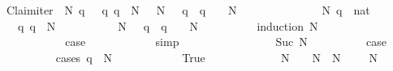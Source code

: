\begin{isabellebody}
\ Claim{}{\isacharunderscore}iter{\isacharprime}{\isacharcolon}\ {\isachardoublequoteopen}{\isasymAnd}\ N\ q{\isachardot}\ {\isasymlbrakk}{}\ {\isasymle}\ q{\isacharsemicolon}\ q\ {\isasymle}\ N{\isasymrbrakk}\ {\isasymLongrightarrow}\ {\isasymDelta}\ {\isacharparenleft}N{\isacharplus}{}{\isacharparenright}\ {\isasymle}\ {\isasymDelta}\ {\isacharparenleft}q{\isacharplus}{}{\isacharparenright}\ {\isacharasterisk}\ {\isacharparenleft}q\ {\isacharplus}\ {}{\isacharparenright}\ {\isacharslash}\ {\isacharparenleft}N\ {\isacharplus}\ {}{\isacharparenright}{\isachardoublequoteclose}\isanewline
\ \ \ \ \isamarkupfalse%
{\isacharminus}\isanewline
\ \ \ \ \ \ \isamarkupfalse%
\ N\ q\ {\isacharcolon}{\isacharcolon}\ nat\isanewline
\ \ \ \ \ \ \isamarkupfalse%
\ {\isachardoublequoteopen}{}\ {\isasymle}\ q{\isachardoublequoteclose}\ {\isachardoublequoteopen}q\ {\isasymle}\ N{\isachardoublequoteclose}\isanewline
\ \ \ \ \ \ \isamarkupfalse%
\ \isamarkupfalse%
\ {\isachardoublequoteopen}{\isasymDelta}\ {\isacharparenleft}N{\isacharplus}{}{\isacharparenright}\ {\isasymle}\ {\isasymDelta}\ {\isacharparenleft}q{\isacharplus}{}{\isacharparenright}\ {\isacharasterisk}\ {\isacharparenleft}q\ {\isacharplus}\ {}{\isacharparenright}\ {\isacharslash}\ {\isacharparenleft}N\ {\isacharplus}\ {}{\isacharparenright}{\isachardoublequoteclose}\isanewline
\ \ \ \ \ \ \isamarkupfalse%
\ {\isacharparenleft}induction\ N{\isacharparenright}\isanewline
\ \ \ \ \ \ \ \ \isamarkupfalse%
\ {}\isanewline
\ \ \ \ \ \ \ \ \isamarkupfalse%
\ \isamarkupfalse%
\ {\isacharquery}case\isanewline
\ \ \ \ \ \ \ \ \ \ \isamarkupfalse%
\ simp\isanewline
\ \ \ \ \ \ \isamarkupfalse%
\isanewline
\ \ \ \ \ \ \ \ \isamarkupfalse%
\ {\isacharparenleft}Suc\ N{\isacharparenright}\isanewline
\ \ \ \ \ \ \ \ \isamarkupfalse%
\ {\isacharquery}case\isanewline
\ \ \ \ \ \ \ \ \isamarkupfalse%
\ {\isacharparenleft}cases\ {\isachardoublequoteopen}q\ {\isasymle}\ N{\isachardoublequoteclose}{\isacharparenright}\isanewline
\ \ \ \ \ \ \ \ \ \ \isamarkupfalse%
\ True\isanewline
\ \ \ \ \ \ \ \ \ \ \isamarkupfalse%
\ {\isachardoublequoteopen}{\isasymDelta}\ {\isacharparenleft}N\ {\isacharplus}\ {}{\isacharparenright}\ {\isasymle}\ {\isacharparenleft}{\isacharparenleft}N\ {\isacharplus}\ {}{\isacharparenright}{\isacharslash}{\isacharparenleft}N\ {\isacharplus}\ {}{\isacharparenright}{\isacharparenright}\ {\isacharasterisk}\ {\isasymDelta}\ {\isacharparenleft}N\ {\isacharplus}\ {}{\isacharparenright}{\isachardoublequoteclose}\isanewline

\end{isabellebody}

